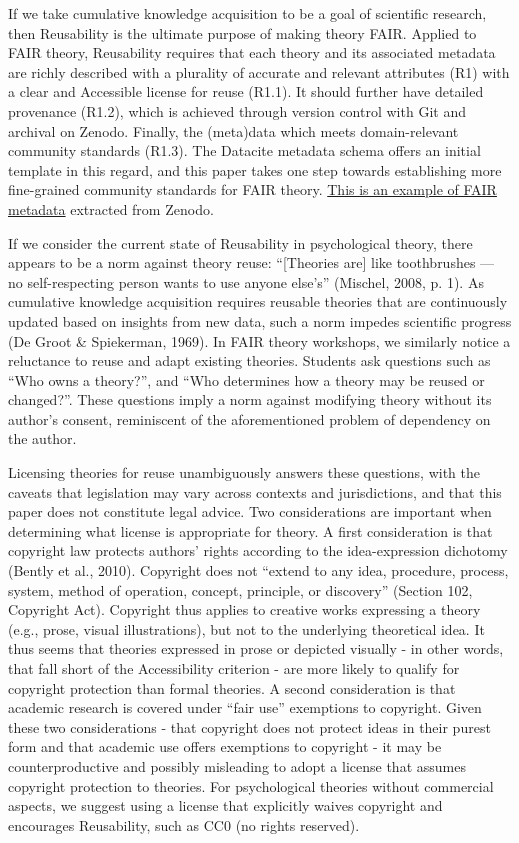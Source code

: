 \documentclass[man]{apa7}
\begin{document}
If we take cumulative knowledge acquisition to be a goal of scientific research, then Reusability is the ultimate purpose of making theory FAIR.
Applied to FAIR theory, Reusability requires that each theory and its associated metadata are richly described with a plurality of accurate and relevant attributes (R1) with a clear and Accessible license for reuse (R1.1).
It should further have detailed provenance (R1.2),
which is achieved through version control with Git and archival on Zenodo.
Finally, the (meta)data which meets domain-relevant community standards (R1.3).
The Datacite metadata schema offers an initial template in this regard,
and this paper takes one step towards establishing more fine-grained community standards for FAIR theory.
\href{https://github.com/cjvanlissa/fair_theory/blob/3b4894da576cb76d19e911a05dd513d5172058ec/example_metadata.json}{This is an example of FAIR metadata} extracted from Zenodo.

If we consider the current state of Reusability in psychological theory, there appears to be a norm against theory reuse:
``{[}Theories are{]} like toothbrushes --- no self-respecting person wants to use anyone else's'' (Mischel, 2008, p. 1).
As cumulative knowledge acquisition requires reusable theories that are continuously updated based on insights from new data, such a norm impedes scientific progress (De Groot \& Spiekerman, 1969).
In FAIR theory workshops, we similarly notice a reluctance to reuse and adapt existing theories.
Students ask questions such as ``Who owns a theory?'',
and ``Who determines how a theory may be reused or changed?''.
These questions imply a norm against modifying theory without its author's consent, reminiscent of the aforementioned problem of dependency on the author.

Licensing theories for reuse unambiguously answers these questions,
with the caveats that legislation may vary across contexts and jurisdictions, and that this paper does not constitute legal advice.
Two considerations are important when determining what license is appropriate for theory.
A first consideration is that copyright law protects authors' rights according to the idea-expression dichotomy (Bently et al., 2010).
Copyright does not
``extend to any idea, procedure, process, system, method of operation, concept, principle, or discovery'' (Section 102, Copyright Act).
Copyright thus applies to creative works expressing a theory (e.g., prose, visual illustrations),
but not to the underlying theoretical idea.
It thus seems that theories expressed in prose or depicted visually - in other words, that fall short of the Accessibility criterion - are more likely to qualify for copyright protection than formal theories.
A second consideration is that academic research is covered under ``fair use'' exemptions to copyright.
Given these two considerations - that copyright does not protect ideas in their purest form and that academic use offers exemptions to copyright - it may be counterproductive and possibly misleading to adopt a license that assumes copyright protection to theories.
For psychological theories without commercial aspects, we suggest using a license that explicitly waives copyright and encourages Reusability,
such as CC0 (no rights reserved).
\end{document}
